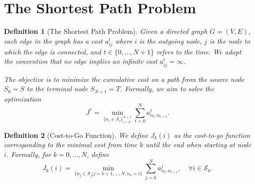 \documentclass[a4 paper]{article}
\numberwithin{equation}{section}
\theoremstyle{boldStyle}
\theoremstyle{boldBlueStyle}
\theoremstyle{boldPurpleStyle}
\theoremstyle{boldRedStyle}
\newtheorem{definition}{Definition}[section]
\theoremstyle{boldGreenStyle}
\begin{document}
\newpage
\section{The Shortest Path Problem}

\begin{definition}[The Shortest Path Problem]
  Given a directed graph \( G = (V, E) \), each edge in the graph has a cost \( a^t_{ij} \) where 
  \( i \) is the outgoing node, \( j \) is the node to which the edge is connected, 
  and \( t \in \{0, \ldots, N+1\} \) refers to the time. We adopt the convention that no edge implies 
  an infinite cost \( a^t_{ij} = \infty \).

  The objective is to minimize the cumulative cost on a path from the source node \( S_0 = S \) to the 
  terminal node \( S_{N+1} = T \). Formally, we aim to solve the optimization
  \begin{equation}
      J^* = \min_{\{n_i \in \mathcal{S}_i\}_{i=0}^{N+1}} \sum_{t=0}^{N} a^t_{n_t, n_{t+1}}.
  \end{equation}
\end{definition}

\begin{definition}[Cost-to-Go Function]
  We define \( J_k(i) \) as the cost-to-go function corresponding to the minimal cost from time \( k \) 
  until the end when starting at node \( i \). Formally, for \( k = 0, \ldots, N \), define
  \begin{equation}
      J_k(i) = \min_{\{n_j \in \mathcal{S}_j | j=k+1,\ldots,N,n_k=i\}} \sum_{j=k}^{N} a^j_{n_t, n_{t+1}}, 
      \quad \forall i \in \mathcal{S}_k.
  \end{equation}
\end{definition}
\end{document}
